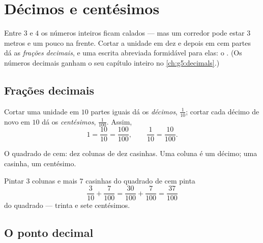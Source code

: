 \chapter{Décimos e centésimos}\label{ch:g4:decimals}

Entre $3$ e $4$ os números inteiros ficam calados --- mas um corredor
pode estar $3$ metros e um pouco na frente. Cortar a unidade em dez
e depois em cem partes dá as \emph{frações decimais}, e uma escrita
abreviada formidável para elas: o . (Os números decimais
ganham o seu capítulo inteiro no \cref{ch:g5:decimals}.)

\section{Frações decimais}

\begin{definition}\label{def:g4:decimals:def}
Cortar uma unidade em $10$ partes iguais dá os \emph{décimos},
$\frac{1}{10}$; cortar cada décimo de novo em $10$ dá os
\emph{centésimos}, $\frac{1}{100}$. Assim,
\[
1 = \frac{10}{10} = \frac{100}{100},
\qquad
\frac{1}{10} = \frac{10}{100}.
\]
\end{definition}

\begin{omfigure}

{\small O quadrado de cem: dez colunas de dez casinhas. Uma coluna é
um décimo; uma casinha, um centésimo.}
\end{omfigure}

\begin{example}\label{ex:g4:decimals:count}
Pintar $3$ colunas e mais $7$ casinhas do quadrado de cem pinta
\[
\frac{3}{10} + \frac{7}{100} = \frac{30}{100} + \frac{7}{100}
= \frac{37}{100}
\]
do quadrado --- trinta e sete centésimos.
\end{example}

\section{O ponto decimal}


